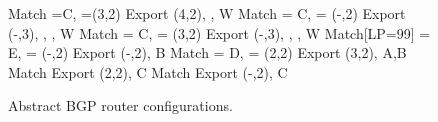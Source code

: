 \begin{figure}[t!]
\begin{code}
  Match \PEER=C, \COMM=(3,2)
    Export \COMM \Arrow (4,2), \MED {}, \PEER \Arrow W
  Match \PEER = C, \COMM = (-,2)
    Export \COMM \Arrow (-,3), \COMM \Arrow {},
           \MED {}, \PEER \Arrow W
  Match \PEER = C, \COMM = (3,2)
    Export \COMM \Arrow (-,3), \COMM \Arrow {},
           \MED {}, \PEER \Arrow W
  Match[LP=99] \PEER = E, \COMM = (-,2) 
    Export \COMM \Arrow (-,2), \PEER \Arrow B
  Match \PEER = D, \COMM = (2,2)
    Export \COMM \Arrow (3,2), \PEER \Arrow A,B
  Match 
    Export \COMM \Arrow (2,2), \PEER \Arrow C
  Match 
    Export \COMM \Arrow (-,2), \PEER \Arrow C
\end{code}\vspace{-.5cm}
\caption{Abstract BGP router configurations. \label{fig:abgp-config}}
\end{figure}



